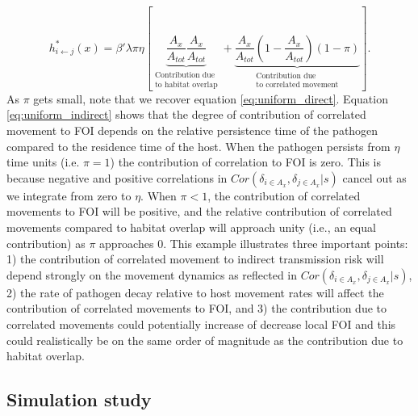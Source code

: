 \documentclass[letterpaper]{article}
\begin{document}
\begin{equation}
    h^*_{i \leftarrow j}(x) = \beta' \lambda \pi \eta \left[ \underbrace{\frac{A_x}{A_{tot}}\frac{A_x}{A_{tot}}}_{\substack{\text{Contribution due} \\ \text{to habitat overlap}}} + \underbrace{\frac{A_x}{A_{tot}}(1 - \frac{A_x}{A_{tot}}) (1 - \pi)}_{\substack{\text{Contribution due} \\ \text{to correlated movement}}} \right].
    \label{eq:uniform_indirect}
\end{equation}
As $\pi$ gets small, note that we recover equation \ref{eq:uniform_direct}.  Equation \ref{eq:uniform_indirect} shows that the degree of contribution of correlated movement to FOI depends on the relative persistence time of the pathogen compared to the residence time of the host.  
When the pathogen persists from $\eta$ time units (i.e. $\pi = 1$) the contribution of correlation to FOI is zero.  This is because negative and positive correlations in $Cor(\delta_{i \in A_x}, \delta_{j \in A_x} | s)$ cancel out as we integrate from zero to $\eta$.  
When $\pi < 1$, the contribution of correlated movements to FOI will be positive, and the relative contribution of correlated movements compared to habitat overlap will approach unity (i.e., an equal contribution) as $\pi$ approaches 0. 
This example illustrates three important points: 1) the contribution of correlated movement to indirect transmission risk will depend strongly on the movement dynamics as reflected in $Cor(\delta_{i \in A_x}, \delta_{j \in A_x} | s)$, 2) the rate of pathogen decay relative to host movement rates will affect the contribution of correlated movements to FOI, and 3) the contribution due to correlated movements could potentially increase of decrease local FOI and this could realistically be on the same order of magnitude as the contribution due to habitat overlap.  


\subsection*{Simulation study}
\end{document}
